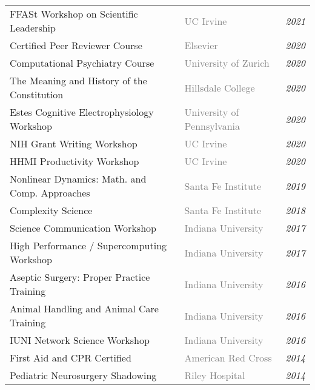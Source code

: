 \documentclass[10pt]{cooperCV2}
\begin{document}
\begin{longtable}{@{} l l @{\extracolsep{\fill}}  l @{}} 
	 
	FFASt Workshop on Scientific Leadership & \textcolor{gray}{UC Irvine}  & \textit{2021} \\
	 
	Certified Peer Reviewer Course & \textcolor{gray}{Elsevier}  & \textit{2020} \\
	 
	Computational Psychiatry Course & \textcolor{gray}{University of Zurich}  & \textit{2020} \\
	 
	The Meaning and History of the Constitution & \textcolor{gray}{Hillsdale College}  & \textit{2020} \\
	 
	Estes Cognitive Electrophysiology Workshop & \textcolor{gray}{University of Pennsylvania}  & \textit{2020} \\
	 
	NIH Grant Writing Workshop & \textcolor{gray}{UC Irvine}  & \textit{2020} \\
	 
	HHMI Productivity Workshop & \textcolor{gray}{UC Irvine}  & \textit{2020} \\
	 
	Nonlinear Dynamics: Math. and Comp. Approaches & \textcolor{gray}{Santa Fe Institute}  & \textit{2019} \\
	 
	Complexity Science & \textcolor{gray}{Santa Fe Institute}  & \textit{2018} \\
	 
	Science Communication Workshop & \textcolor{gray}{Indiana University}  & \textit{2017} \\
	 
	High Performance / Supercomputing Workshop & \textcolor{gray}{Indiana University}  & \textit{2017} \\
	 
	Aseptic Surgery: Proper Practice Training & \textcolor{gray}{Indiana University}  & \textit{2016} \\
	 
	Animal Handling and Animal Care Training & \textcolor{gray}{Indiana University}  & \textit{2016} \\
	 
	IUNI Network Science Workshop & \textcolor{gray}{Indiana University}  & \textit{2016} \\
	 
	First Aid and CPR Certified & \textcolor{gray}{American Red Cross}  & \textit{2014} \\
	 
	Pediatric Neurosurgery Shadowing & \textcolor{gray}{Riley Hospital}  & \textit{2014} \\
	
\end{longtable}
\end{document}
